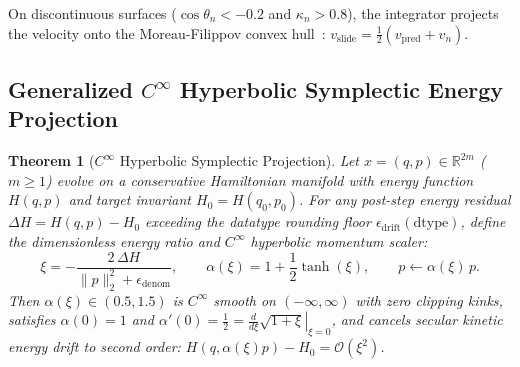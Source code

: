 \documentclass[10pt,twocolumn,letterpaper]{article}
\newtheorem{theorem}{Theorem}[section]
\theoremstyle{definition}
\theoremstyle{remark}
\newcommand{\R}{\mathbb{R}}
\begin{document}
On discontinuous surfaces ($\cos\theta_n < -0.2$ and $\kappa_n > 0.8$), the integrator projects the velocity onto the Moreau-Filippov convex hull~\cite{filippov1988differential}: $v_{\mathrm{slide}} = \frac{1}{2}(v_{\mathrm{pred}} + v_n)$.

\subsection{Generalized $C^\infty$ Hyperbolic Symplectic Energy Projection}

\begin{theorem}[$C^\infty$ Hyperbolic Symplectic Projection]
\label{thm:symplectic}
Let $x = (q, p) \in \R^{2m}$ ($m \ge 1$) evolve on a conservative Hamiltonian manifold with energy function $H(q, p)$ and target invariant $H_0 = H(q_0, p_0)$. For any post-step energy residual $\Delta H = H(q, p) - H_0$ exceeding the datatype rounding floor $\epsilon_{\mathrm{drift}}(\mathrm{dtype})$, define the dimensionless energy ratio and $C^\infty$ hyperbolic momentum scaler:
\begin{equation}
  \xi = -\frac{2\,\Delta H}{\|p\|_2^2 + \epsilon_{\mathrm{denom}}}, \qquad \alpha(\xi) = 1 + \frac{1}{2}\tanh(\xi), \qquad p \leftarrow \alpha(\xi)\,p.
  \label{eq:hyperbolic_symplectic}
\end{equation}
Then $\alpha(\xi) \in (0.5, 1.5)$ is $C^\infty$ smooth on $(-\infty, \infty)$ with zero clipping kinks, satisfies $\alpha(0) = 1$ and $\alpha'(0) = \frac{1}{2} = \left.\frac{d}{d\xi}\sqrt{1+\xi}\right|_{\xi=0}$, and cancels secular kinetic energy drift to second order: $H(q, \alpha(\xi)p) - H_0 = \mathcal{O}(\xi^2)$.
\end{theorem}
\end{document}
